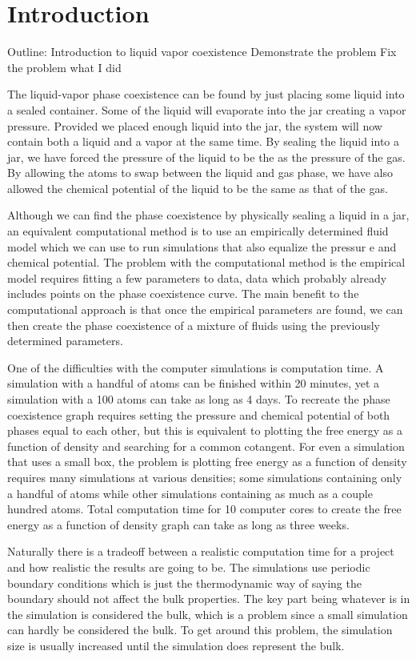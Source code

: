 \section{Introduction}
Outline:
Introduction to liquid vapor coexistence
Demonstrate the problem
Fix the problem
what I did

The liquid-vapor phase coexistence can be found by just placing some liquid into a sealed container. Some of the liquid will evaporate into the jar creating a vapor pressure. Provided we placed enough liquid into the jar, the system will now contain both a liquid and a vapor at the same time. By sealing the liquid into a jar, we have forced the pressure of the liquid to be the as the pressure of the gas. By allowing the atoms to swap between the liquid and gas phase, we have also allowed the chemical potential of the liquid to be the same as that of the gas.

Although we can find the phase coexistence by physically sealing a liquid in a jar, an equivalent computational method is to use an empirically determined fluid model which we can use to run simulations that also equalize the pressur
e and chemical potential. The problem with the computational method is the empirical model requires fitting a few parameters to data, data which probably already includes points on the phase coexistence curve. The main benefit to the computational approach is that once the empirical parameters are found, we can then create the phase coexistence of a mixture of fluids using the previously determined parameters.

One of the difficulties with the computer simulations is computation time. A simulation with a handful of atoms can be finished within 20 minutes, yet a simulation with a 100 atoms can take as long as 4 days. To recreate the phase coexistence graph requires setting the pressure and chemical potential of both phases equal to each other, but this is equivalent to plotting the free energy as a function of density and searching for a common cotangent. For even a simulation that uses a small box, the problem is plotting free energy as a function of density requires many simulations at various densities; some simulations containing only a handful of atoms while other simulations containing as much as a couple hundred atoms. Total computation time for 10 computer cores to create the free energy as a function of density graph can take as long as three weeks.

Naturally there is a tradeoff between a realistic computation time for a project and how realistic the results are going to be. The simulations use periodic boundary conditions which is just the thermodynamic way of saying the boundary should not affect the bulk properties. The key part being whatever is in the simulation is considered the bulk, which is a problem since a small simulation can hardly be considered the bulk. To get around this problem, the simulation size is usually increased until the simulation does represent the bulk. 

